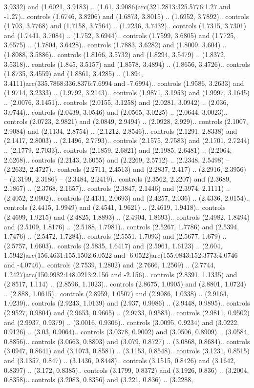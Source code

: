 \begin{scope}[draw=black,line width=0.0422cm,miter limit=10.0]
3.9332) and (1.6021, 3.9183) .. (1.61, 3.9086)arc(321.2813:325.5776:1.27 and -1.27).. controls (1.6746, 3.8206) and (1.6873, 3.8015) .. (1.6952, 3.7892).. controls (1.703, 3.7768) and (1.7158, 3.7564) .. (1.7236, 3.7432).. controls (1.7315, 3.7301) and (1.7441, 3.7084) .. (1.752, 3.6944).. controls (1.7599, 3.6805) and (1.7725, 3.6575) .. (1.7804, 3.6428).. controls (1.7883, 3.6282) and (1.8009, 3.604) .. (1.8088, 3.5886).. controls (1.8166, 3.5732) and (1.8294, 3.5479) .. (1.8372, 3.5318).. controls (1.845, 3.5157) and (1.8578, 3.4894) .. (1.8656, 3.4726).. controls (1.8735, 3.4559) and (1.8861, 3.4285) .. (1.894, 3.4111)arc(335.7868:336.8376:7.6994 and -7.6994).. controls (1.9586, 3.2633) and (1.9714, 3.2333) .. (1.9792, 3.2143).. controls (1.9871, 3.1953) and (1.9997, 3.1645) .. (2.0076, 3.1451).. controls (2.0155, 3.1258) and (2.0281, 3.0942) .. (2.036, 3.0744).. controls (2.0439, 3.0546) and (2.0565, 3.0225) .. (2.0644, 3.0023).. controls (2.0723, 2.9821) and (2.0849, 2.9494) .. (2.0928, 2.929).. controls (2.1007, 2.9084) and (2.1134, 2.8754) .. (2.1212, 2.8546).. controls (2.1291, 2.8338) and (2.1417, 2.8003) .. (2.1496, 2.7793).. controls (2.1575, 2.7583) and (2.1701, 2.7244) .. (2.1779, 2.7033).. controls (2.1859, 2.6821) and (2.1985, 2.6481) .. (2.2064, 2.6268).. controls (2.2143, 2.6055) and (2.2269, 2.5712) .. (2.2348, 2.5498) -- (2.2632, 2.4727).. controls (2.2711, 2.4513) and (2.2837, 2.417) .. (2.2916, 2.3956) -- (2.3199, 2.3186) -- (2.3484, 2.2419).. controls (2.3562, 2.2207) and (2.3689, 2.1867) .. (2.3768, 2.1657).. controls (2.3847, 2.1446) and (2.3974, 2.1111) .. (2.4052, 2.0902).. controls (2.4131, 2.0693) and (2.4257, 2.036) .. (2.4336, 2.0154).. controls (2.4415, 1.9949) and (2.4541, 1.9621) .. (2.4619, 1.9418).. controls (2.4699, 1.9215) and (2.4825, 1.8893) .. (2.4904, 1.8693).. controls (2.4982, 1.8494) and (2.5109, 1.8176) .. (2.5188, 1.7981).. controls (2.5267, 1.7786) and (2.5394, 1.7476) .. (2.5472, 1.7284).. controls (2.5551, 1.7093) and (2.5677, 1.679) .. (2.5757, 1.6603).. controls (2.5835, 1.6417) and (2.5961, 1.6123) .. (2.604, 1.5942)arc(156.4631:155.1502:6.0522 and -6.0522)arc(155.0843:152.3773:4.0746 and -4.0746).. controls (2.7539, 1.2802) and (2.7666, 1.2569) .. (2.7744, 1.2427)arc(150.9982:148.0213:2.156 and -2.156).. controls (2.8391, 1.1335) and (2.8517, 1.114) .. (2.8596, 1.1023).. controls (2.8675, 1.0905) and (2.8801, 1.0724) .. (2.888, 1.0615).. controls (2.8959, 1.0507) and (2.9086, 1.0338) .. (2.9164, 1.0239).. controls (2.9243, 1.0139) and (2.937, 0.9986) .. (2.9448, 0.9895).. controls (2.9527, 0.9804) and (2.9653, 0.9665) .. (2.9733, 0.9583).. controls (2.9811, 0.9502) and (2.9937, 0.9379) .. (3.0016, 0.9306).. controls (3.0095, 0.9234) and (3.0222, 0.9126) .. (3.03, 0.9064).. controls (3.0378, 0.9002) and (3.0506, 0.8909) .. (3.0584, 0.8856).. controls (3.0663, 0.8803) and (3.079, 0.8727) .. (3.0868, 0.8684).. controls (3.0947, 0.8641) and (3.1073, 0.8581) .. (3.1153, 0.8548).. controls (3.1231, 0.8515) and (3.1357, 0.847) .. (3.1436, 0.8448).. controls (3.1515, 0.8426) and (3.1642, 0.8397) .. (3.172, 0.8385).. controls (3.1799, 0.8372) and (3.1926, 0.836) .. (3.2004, 0.8358).. controls (3.2083, 0.8356) and (3.221, 0.836) .. (3.2288, 
\end{scope}

